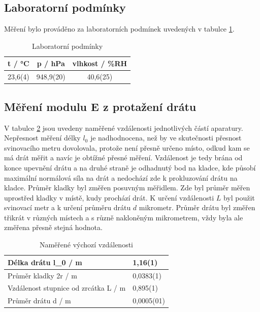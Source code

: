 \subsection{Laboratorní podmínky}

    Měření bylo prováděno za laboratorních podmínek uvedených v tabulce \ref{tab:lab_pod}.

    \begin{table}[h]
        \centering
        \begin{tabular}{|c|c|c|} 
        \hline
            t / °C & p / hPa & vlhkost / \%RH  \\ 
        \hline
            23,6(4)   & 948,9(20)   & 40,6(25)            \\
        \hline
        \end{tabular}
        \caption{Laboratorní podmínky}
        \label{tab:lab_pod}
    \end{table}

\newpage

\subsection{Měření modulu E z protažení drátu}

V tabulce \ref{tab:vychozi-vzdalenosti} jsou uvedeny naměřené vzdálenosti jednotlivých částí aparatury. Nepřesnost měření délky \(l_0\) je nadhodnocena, než by ve skutečnosti přesnost svinovacího metru dovolovala, protože není přesně určeno místo, odkud kam se má drát měřit a navíc je obtížné přesné měření. Vzdálenost je tedy brána od konce upevnění drátu a na druhé straně je odhadnutý bod na kladce, kde působí maximální normálová síla na drát a nedochází zde k prokluzování drátu na kladce. Průměr kladky byl změřen posuvným měřidlem. Zde byl průměr měřen uprostřed kladky v místě, kudy prochází drát. K určení vzdálenosti \(L\) byl použit svinovací metr a k určení průměru drátu \(d\) mikrometr. Průměr drátu byl změřen třikrát v různých místech a s různě nakloněným mikrometrem, vždy byla ale změřena přesně stejná hodnota.

\begin{table}[h]
\centering
\begin{tabular}{|l|l|}
\hline
Délka drátu l_0 / m                 & 1,16(1)   \\ \hline
Průměr kladky 2r / m                 & 0,0383(1) \\ \hline
Vzdálenost stupnice od zrcátka L / m & 0,895(1)  \\ \hline
Průměr drátu d / m                   & 0,0005(01) \\ \hline
\end{tabular}
\caption{Naměřené výchozí vzdálenosti}
\label{tab:vychozi-vzdalenosti}
\end{table}

